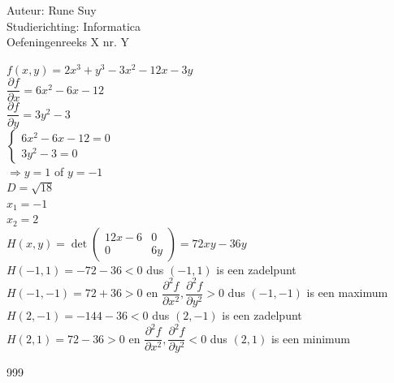 \documentclass[a4paper]{article}
\begin{document}
  
\noindent \large Auteur: Rune Suy \\
\noindent \large Studierichting: Informatica\\
\noindent \large Oefeningenreeks X nr. Y\\

\medskip

\normalsize

$f(x,y) = 2x^3 + y^3 - 3x^2 - 12x - 3y$\\

$\dfrac{\partial f}{\partial x} = 6x^2 - 6x - 12$\\

$\dfrac{\partial f}{\partial y} = 3y^2 - 3$\\

$\left\{
    \begin{array}{l}
        6x^2 - 6x - 12 = 0\\
        3y^2 - 3 = 0
    \end{array}
\right.$\\

$\Rightarrow y=1$ of $y=-1$\\

$D=\sqrt{18}$\\

$x_1 = -1$\\

$x_2 = 2$\\

$H(x,y) = \det \left(\begin{array}{cc}
    12x-6 & 0\\
    0 & 6y
\end{array}\right) = 72xy-36y$\\

$H(-1,1) = -72-36 < 0$ dus $(-1,1)$ is een zadelpunt\\

$H(-1,-1) = 72+36 > 0$ en $\dfrac{\partial^2 f}{\partial x^2}, \dfrac{\partial^2 f}{\partial y^2} > 0$ dus $(-1,-1)$ is een maximum\\

$H(2,-1) = -144 - 36 < 0$ dus $(2,-1)$ is een zadelpunt\\

$H(2,1) = 72 - 36 > 0$ en $\dfrac{\partial^2 f}{\partial x^2}, \dfrac{\partial^2 f}{\partial y^2} < 0$ dus $(2,1)$ is een minimum\\

\begin{thebibliography}{999}
\end{thebibliography}
\end{document}
